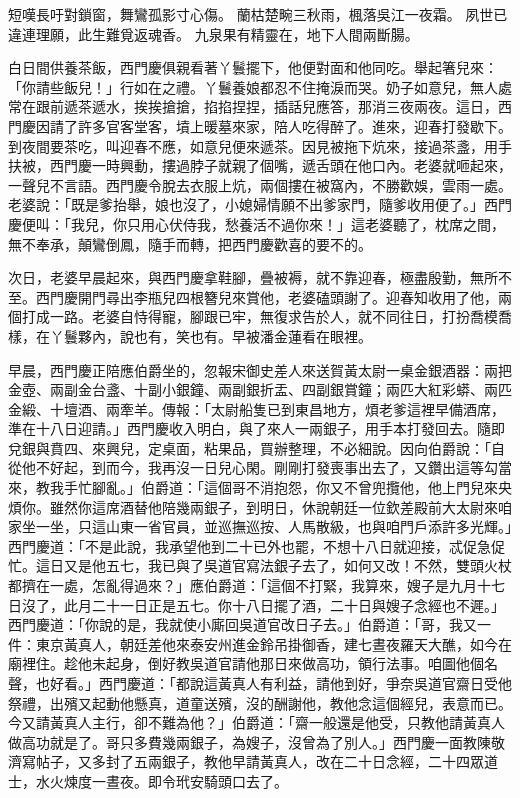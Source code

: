 短嘆長吁對鎖窗，舞鸞孤影寸心傷。
蘭枯楚畹三秋雨，楓落吳江一夜霜。
夙世已違連理願，此生難覓返魂香。
九泉果有精靈在，地下人間兩斷腸。

白日間供養茶飯，西門慶俱親看著丫鬟擺下，他便對面和他同吃。舉起箸兒來：「你請些飯兒！」行如在之禮。丫鬟養娘都忍不住掩淚而哭。奶子如意兒，無人處常在跟前遞茶遞水，挨挨搶搶，掐掐捏捏，插話兒應答，那消三夜兩夜。這日，西門慶因請了許多官客堂客，墳上暖墓來家，陪人吃得醉了。進來，迎春打發歇下。到夜間要茶吃，叫迎春不應，如意兒便來遞茶。因見被拖下炕來，接過茶盞，用手扶被，西門慶一時興動，摟過脖子就親了個嘴，遞舌頭在他口內。老婆就咂起來，一聲兒不言語。西門慶令脫去衣服上炕，兩個摟在被窩內，不勝歡娛，雲雨一處。老婆說：「既是爹抬舉，娘也沒了，小媳婦情願不出爹家門，隨爹收用便了。」西門慶便叫：「我兒，你只用心伏侍我，愁養活不過你來！」這老婆聽了，枕席之間，無不奉承，顛鸞倒鳳，隨手而轉，把西門慶歡喜的要不的。

次日，老婆早晨起來，與西門慶拿鞋腳，疊被褥，就不靠迎春，極盡殷勤，無所不至。西門慶開門尋出李瓶兒四根簪兒來賞他，老婆磕頭謝了。迎春知收用了他，兩個打成一路。老婆自恃得寵，腳跟已牢，無復求告於人，就不同往日，打扮喬模喬樣，在丫鬟夥內，說也有，笑也有。早被潘金蓮看在眼裡。

早晨，西門慶正陪應伯爵坐的，忽報宋御史差人來送賀黃太尉一桌金銀酒器：兩把金壺、兩副金台盞、十副小銀鐘、兩副銀折盂、四副銀賞鐘；兩匹大紅彩蟒、兩匹金緞、十壇酒、兩牽羊。傳報：「太尉船隻已到東昌地方，煩老爹這裡早備酒席，準在十八日迎請。」西門慶收入明白，與了來人一兩銀子，用手本打發回去。隨即兌銀與賁四、來興兒，定桌面，粘果品，買辦整理，不必細說。因向伯爵說：「自從他不好起，到而今，我再沒一日兒心閑。剛剛打發喪事出去了，又鑽出這等勾當來，教我手忙腳亂。」伯爵道：「這個哥不消抱怨，你又不曾兜攬他，他上門兒來央煩你。雖然你這席酒替他陪幾兩銀子，到明日，休說朝廷一位欽差殿前大太尉來咱家坐一坐，只這山東一省官員，並巡撫巡按、人馬散級，也與咱門戶添許多光輝。」西門慶道：「不是此說，我承望他到二十已外也罷，不想十八日就迎接，忒促急促忙。這日又是他五七，我已與了吳道官寫法銀子去了，如何又改！不然，雙頭火杖都擠在一處，怎亂得過來？」應伯爵道：「這個不打緊，我算來，嫂子是九月十七日沒了，此月二十一日正是五七。你十八日擺了酒，二十日與嫂子念經也不遲。」西門慶道：「你說的是，我就使小廝回吳道官改日子去。」伯爵道：「哥，我又一件：東京黃真人，朝廷差他來泰安州進金鈴吊掛御香，建七晝夜羅天大醮，如今在廟裡住。趁他未起身，倒好教吳道官請他那日來做高功，領行法事。咱圖他個名聲，也好看。」西門慶道：「都說這黃真人有利益，請他到好，爭奈吳道官齋日受他祭禮，出殯又起動他懸真，道童送殯，沒的酬謝他，教他念這個經兒，表意而已。今又請黃真人主行，卻不難為他？」伯爵道：「齋一般還是他受，只教他請黃真人做高功就是了。哥只多費幾兩銀子，為嫂子，沒曾為了別人。」西門慶一面教陳敬濟寫帖子，又多封了五兩銀子，教他早請黃真人，改在二十日念經，二十四眾道士，水火煉度一晝夜。即令玳安騎頭口去了。

